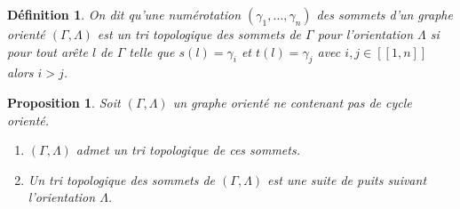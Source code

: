 \documentclass[a4paper,10pt]{article}
\newtheorem{defi}[]{Définition}[section]
\newtheorem{prop}[]{Proposition}[section]
\begin{document}
\begin{defi}
	On dit qu'une numérotation $(\gamma_{1}, \dots, \gamma_{n})$ des sommets d'un graphe orienté $(\Gamma,\Lambda)$ est un \emph{tri topologique} des sommets de $\Gamma$ pour l'orientation $\Lambda$ si pour tout arête $l$ de $\Gamma$ telle que $s(l) = \gamma_{i}$ et $t(l) = \gamma_{j}$ avec  $i,j \in [\![1,n]\!]$ alors $i>j$.
\end{defi}
\begin{prop}
\label{tri-topo}
Soit $(\Gamma,\Lambda)$ un graphe orienté ne contenant pas de cycle orienté.
  \begin{enumerate}
  \item $(\Gamma,\Lambda)$ admet un tri topologique de ces sommets.
  \item Un tri topologique des sommets de $(\Gamma,\Lambda)$ est une suite de puits suivant l'orientation $\Lambda$.
  \end{enumerate}
\end{prop}
\end{document}
